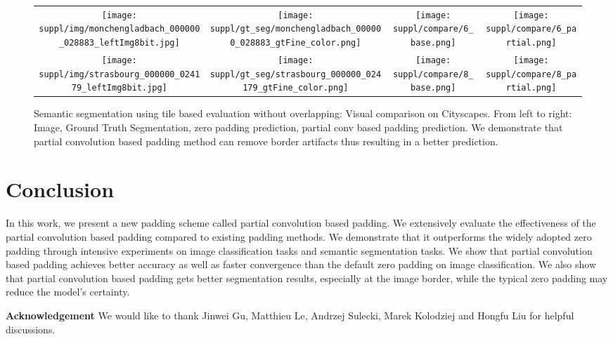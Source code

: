 \documentclass[10pt,twocolumn,letterpaper]{article}
\begin{document}
\begin{figure*}[h!]
{\begin{tabular}{cccc}
    \texttt{[image: suppl/img/monchengladbach\_000000\_028883\_leftImg8bit.jpg]} &
    \texttt{[image: suppl/gt\_seg/monchengladbach\_000000\_028883\_gtFine\_color.png]} &
    \texttt{[image: suppl/compare/6\_base.png]} &
    \texttt{[image: suppl/compare/6\_partial.png]} \\
    \texttt{[image: suppl/img/strasbourg\_000000\_024179\_leftImg8bit.jpg]} &
    \texttt{[image: suppl/gt\_seg/strasbourg\_000000\_024179\_gtFine\_color.png]} &
    \texttt{[image: suppl/compare/8\_base.png]} &
    \texttt{[image: suppl/compare/8\_partial.png]} \\


\end{tabular}
}
\caption{Semantic segmentation using tile based evaluation without overlapping: Visual comparison on Cityscapes.  From left to right:  Image,  Ground Truth Segmentation, zero padding prediction, partial conv based padding prediction. We demonstrate that partial convolution based padding method can remove border  artifacts thus resulting in a better prediction.}
\label{fig:seg_result}
\vspace{-.5cm}
\end{figure*}\section{Conclusion}
In this work, we present a new padding scheme called partial convolution based padding. We extensively evaluate the effectiveness of the partial convolution based padding compared to existing padding methods. We demonstrate that it outperforms the widely adopted zero padding through intensive experiments on image classification tasks and semantic segmentation tasks. We show that partial convolution based padding achieves better accuracy as well as faster convergence than the default zero padding on image classification. We also show that partial convolution based padding gets better segmentation results, especially at the image border, while the typical zero padding may reduce the model's certainty.

\noindent\textbf{Acknowledgement}
We would like to thank Jinwei Gu, Matthieu Le, Andrzej Sulecki, Marek Kolodziej and Hongfu Liu for helpful discussions. 

{\small


}
\end{document}
